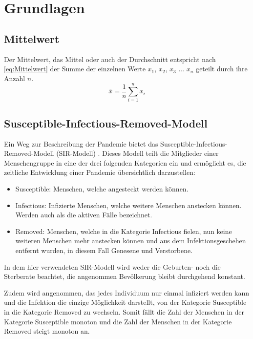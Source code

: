 \chapter{Grundlagen}\label{chap:Grundlagen}

\section{Mittelwert}\label{sec:Grundlagen:Mittelwert}
Der Mittelwert, das Mittel oder auch der Durchschnitt entspricht nach \autoref{eq:Mittelwert} der Summe der einzelnen Werte $x_1$, $x_2$, $x_3$ ... $x_n$ geteilt durch ihre Anzahl $n$.
\begin{equation}\label{eq:Mittelwert}
    \bar x = \frac{1}{n}\sum_{i=1}^n x_i
\end{equation}

\section{Susceptible-Infectious-Removed-Modell}\label{sec:Grundlagen:SIR}
Ein Weg zur Beschreibung der Pandemie bietet das \glqq{}Susceptible-Infectious-Removed-Modell\grqq{} (SIR-Modell) \autocite{SIR}. Dieses Modell teilt die Mitglieder einer Menschengruppe in eine der drei folgenden Kategorien ein und ermöglicht es, die zeitliche Entwicklung einer Pandemie übersichtlich darzustellen:
\begin{itemize}
    \item \glqq{}Susceptible\grqq{}: Menschen, welche angesteckt werden können.
    \item \glqq{}Infectious\grqq{}: Infizierte Menschen, welche weitere Menschen anstecken können. Werden auch als \glqq{}die aktiven Fälle\grqq{} bezeichnet.
    \item \glqq{}Removed\grqq{}: Menschen, welche in die Kategorie \glqq{}Infectious\grqq{} fielen, nun keine weiteren Menschen mehr anstecken können und aus dem Infektionsgeschehen entfernt wurden,
    in diesem Fall Genesene und Verstorbene. 
\end{itemize}
In dem hier verwendeten SIR-Modell wird weder die Geburten- noch die Sterberate beachtet, die angenommen Bevölkerung bleibt durchgehend konstant.

Zudem wird angenommen, das jedes Individuum nur einmal infiziert werden kann und die Infektion die einzige Möglichkeit darstellt, von der Kategorie \glqq{}Susceptible\grqq{} in die Kategorie \glqq{}Removed\grqq{} zu wechseln.
Somit fällt die Zahl der Menschen in der Kategorie \glqq{}Susceptible\grqq{} monoton und die Zahl der Menschen in der Kategorie \glqq{}Removed\grqq{} steigt monoton an.\autocite{SIR}

